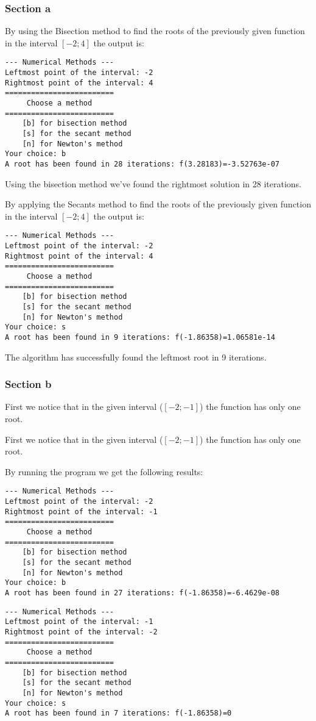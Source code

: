 \documentclass[a4paper,12pt]{article}
\begin{document}
\subsubsection{Section a}
By using the Bisection method to find the roots of the previously given function in the interval $[-2;4]$ the output is:
\begin{verbatim}
--- Numerical Methods ---
Leftmost point of the interval: -2
Rightmost point of the interval: 4
=========================
     Choose a method     
=========================
	[b] for bisection method
	[s] for the secant method
	[n] for Newton's method
Your choice: b
A root has been found in 28 iterations: f(3.28183)=-3.52763e-07
\end{verbatim}
\par Using the bisection method we've found the rightmost solution in 28 iterations.
\par By applying the Secants method to find the roots of the previously given function in the interval $[-2;4]$ the output is:
\begin{verbatim}
--- Numerical Methods ---
Leftmost point of the interval: -2
Rightmost point of the interval: 4
=========================
     Choose a method     
=========================
	[b] for bisection method
	[s] for the secant method
	[n] for Newton's method
Your choice: s
A root has been found in 9 iterations: f(-1.86358)=1.06581e-14
\end{verbatim}
\par The algorithm has successfully found the leftmost root in 9 iterations.
\subsubsection{Section b}
\par First we notice that in the given interval ($[-2;-1]$) the function has only one root.
\par First we notice that in the given interval ($[-2;-1]$) the function has only one root.
\par By running the program we get the following results:
\begin{verbatim}
--- Numerical Methods ---
Leftmost point of the interval: -2
Rightmost point of the interval: -1
=========================
     Choose a method     
=========================
	[b] for bisection method
	[s] for the secant method
	[n] for Newton's method
Your choice: b
A root has been found in 27 iterations: f(-1.86358)=-6.4629e-08
\end{verbatim}
\begin{verbatim}
--- Numerical Methods ---
Leftmost point of the interval: -1
Rightmost point of the interval: -2
=========================
     Choose a method     
=========================
    [b] for bisection method
    [s] for the secant method
    [n] for Newton's method
Your choice: s
A root has been found in 7 iterations: f(-1.86358)=0    
\end{verbatim}
\end{document}

